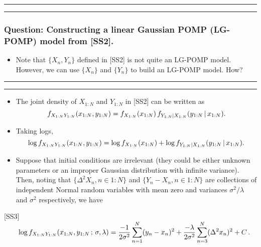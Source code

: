 \documentclass[]{article}
\providecommand{\tightlist}{%
  \setlength{\itemsep}{0pt}\setlength{\parskip}{0pt}}
\begin{document}
\begin{center}\rule{0.5\linewidth}{\linethickness}\end{center}

\begin{center}\rule{0.5\linewidth}{\linethickness}\end{center}

\subsubsection{Question: Constructing a linear Gaussian POMP (LG-POMP)
model from
{[}SS2{]}.}\label{question-constructing-a-linear-gaussian-pomp-lg-pomp-model-from-ss2.}

\begin{itemize}
\tightlist
\item
  Note that \(\{X_n,Y_n\}\) defined in {[}SS2{]} is not quite an LG-POMP
  model. However, we can use \(\{X_n\}\) and \(\{Y_n\}\) to build an
  LG-POMP model. How?
\end{itemize}

\begin{center}\rule{0.5\linewidth}{\linethickness}\end{center}

\begin{center}\rule{0.5\linewidth}{\linethickness}\end{center}

\begin{itemize}
\item
  The joint density of \(X_{1:N}\) and \(Y_{1:N}\) in {[}SS2{]} can be
  written as
  \[ f_{X_{1:N}Y_{1:N}}(x_{1:N},y_{1:N})= f_{X_{1:N}}(x_{1:N}) \, f_{Y_{1:N}|X_{1:N}}(y_{1:N}{\, | \,} x_{1:N}).\]
\item
  Taking logs,
  \[ \log f_{X_{1:N}Y_{1:N}}(x_{1:N},y_{1:N})= \log f_{X_{1:N}}(x_{1:N}) + \log f_{Y_{1:N}|X_{1:N}}(y_{1:N}{\, | \,} x_{1:N}).\]
\item
  Suppose that initial conditions are irrelevant (they could be either
  unknown parameters or an improper Gaussian distribution with infinite
  variance). Then, noting that \(\{\Delta^2 X_{n}, n\in 1:N\}\) and
  \(\{Y_n-X_n, n\in 1:N\}\) are collections of independent Normal random
  variables with mean zero and variances \(\sigma^2/\lambda\) and
  \(\sigma^2\) respectively, we have
\end{itemize}

{[}SS3{]}
\(\quad\quad \displaystyle  \log f_{X_{1:N}Y_{1:N}}(x_{1:N},y_{1:N} \, ; \, \sigma,\lambda) = \frac{-1}{2\sigma^2} \sum_{n=1}^N(y_n-x_n)^2 +\frac{-\lambda}{2\sigma^2} \sum_{n=3}^N(\Delta^2 x_n)^2 + C\).
\end{document}
